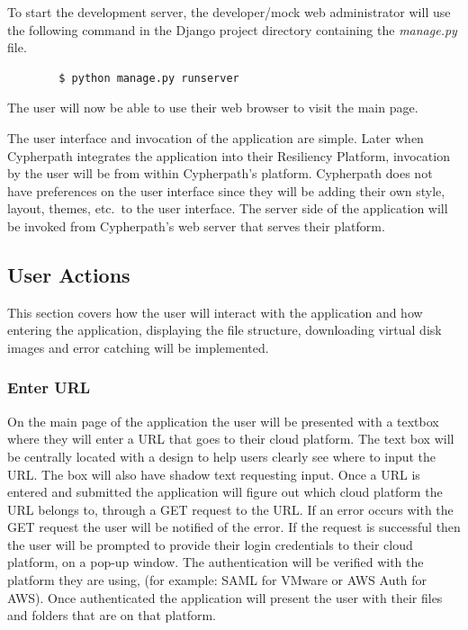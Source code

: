 \documentclass{article}
\begin{document}
        To start the development server, the developer/mock web administrator will use the following command in the Django project directory containing the \textit{manage.py} file.
        \begin{verbatim}
        $ python manage.py runserver
        \end{verbatim}

        The user will now be able to use their web browser to visit the main page.

        The user interface and invocation of the application are simple. Later when Cypherpath integrates the application into their Resiliency Platform, invocation by the user will be from within Cypherpath's
        platform. Cypherpath does not have preferences on the user interface since they will be adding their own style, layout, themes, etc.\ to the user interface. The server side of the application will be invoked
        from Cypherpath's web server that serves their platform.


        \subsection{User Actions}
        This section covers how the user will interact with the application and how entering the application, displaying the file structure, downloading virtual disk images and error catching 
        will be implemented.

            \subsubsection{Enter URL}
            On the main page of the application the user will be presented with a textbox where they will enter a URL that goes to their cloud platform. The text box will be centrally located with a design to
            help users clearly see where to input the URL. The box will also have shadow text requesting input. Once a URL is entered and submitted the application will figure out which cloud platform the URL
            belongs to, through a GET request to the URL. If an error occurs with the GET request the user will be notified of the error. If the request is successful then the user will be prompted to
            provide their login credentials to their cloud platform, on a pop-up window. The authentication will be verified with the platform they are using, (for example: SAML for VMware or AWS Auth for AWS).
            Once authenticated the application will present the user with their files and folders that are on that platform.
            
\end{document}
